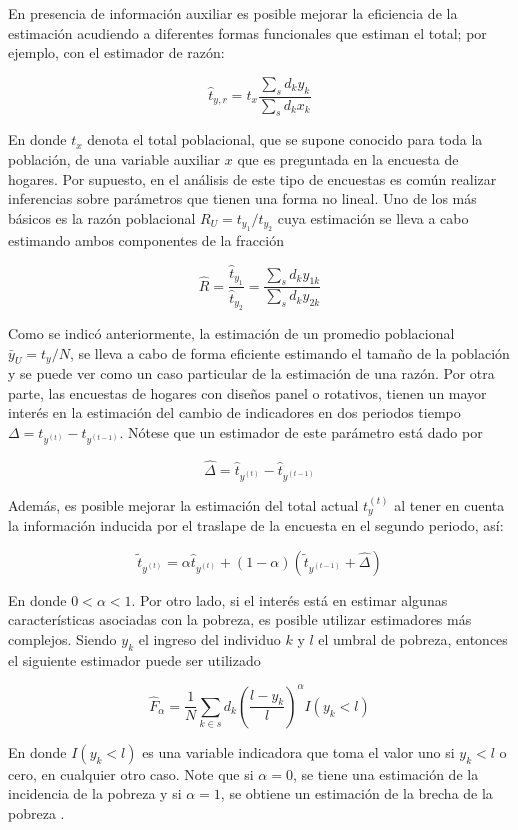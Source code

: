 \documentclass[
  12pt,
  spanish,
]{book}
\begin{document}
En presencia de información auxiliar es posible mejorar la eficiencia de la estimación acudiendo a diferentes formas funcionales que estiman el total; por ejemplo, con el estimador de razón:

\[
\hat{t}_{y, r} = t_x \frac{\sum_s d_k y_k}{\sum_s d_k x_k}
\]

En donde \(t_x\) denota el total poblacional, que se supone conocido para toda la población, de una variable auxiliar \(x\) que es preguntada en la encuesta de hogares. Por supuesto, en el análisis de este tipo de encuestas es común realizar inferencias sobre parámetros que tienen una forma no lineal. Uno de los más básicos es la razón poblacional \(R_U = t_{y_1} / t_{y_2}\) cuya estimación se lleva a cabo estimando ambos componentes de la fracción

\[
\hat{R}= \frac{\hat{t}_{y_1}}{\hat{t}_{y_2}}
= \frac{\sum_s d_k y_{1k}} {\sum_s d_k y_{2k}}
\]

Como se indicó anteriormente, la estimación de un promedio poblacional \(\bar{y}_U = t_y / N\), se lleva a cabo de forma eficiente estimando el tamaño de la población y se puede ver como un caso particular de la estimación de una razón. Por otra parte, las encuestas de hogares con diseños panel o rotativos, tienen un mayor interés en la estimación del cambio de indicadores en dos periodos tiempo \(\Delta = t_{y^{(t)}} - t_{y^{(t-1)}}\). Nótese que un estimador de este parámetro está dado por

\[
\hat{\Delta} = \hat{t}_{y^{(t)}} - \hat{t}_{y^{(t-1)}}
\]

Además, es posible mejorar la estimación del total actual \(t_y^{(t)}\) al tener en cuenta la información inducida por el traslape de la encuesta en el segundo periodo, así:

\[
\tilde{t}_{y^{(t)}} = \alpha \hat{t}_{y^{(t)}} 
+ (1 -\alpha) (\tilde{t}_{y^{(t-1)}} + \hat{\Delta})
\]

En donde \(0 < \alpha < 1\). Por otro lado, si el interés está en estimar algunas características asociadas con la pobreza, es posible utilizar estimadores más complejos. Siendo \(y_k\) el ingreso del individuo \(k\) y \(l\) el umbral de pobreza, entonces el siguiente estimador puede ser utilizado

\[
\hat{F}_{\alpha}=\frac{1}{N}\sum_{k\in s} d_k 
\left(\frac{l-y_k}{l}\right)^{\alpha}I(y_k<l)
\]

En donde \(I(y_k<l)\) es una variable indicadora que toma el valor uno si \(y_k<l\) o cero, en cualquier otro caso. Note que si \(\alpha = 0\), se tiene una estimación de la incidencia de la pobreza y si \(\alpha = 1\), se obtiene un estimación de la brecha de la pobreza \citep{Foster_Greer_Thorbecke_1984}.
\end{document}

